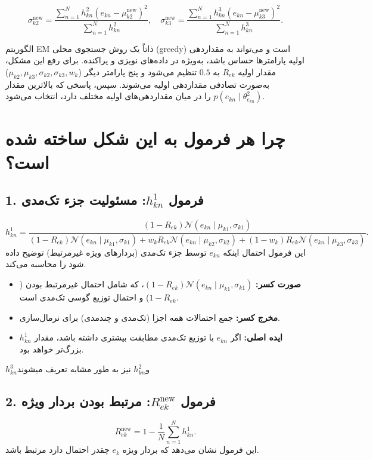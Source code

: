 \documentclass[a4paper,12pt,openany]{report}
\begin{document}
\begin{itemize}
	\[
	\sigma_{k2}^{\text{new}} = \frac{\sum_{n=1}^N h_{kn}^2 (e_{kn} - \mu_{k2}^{\text{new}})^2}{\sum_{n=1}^N h_{kn}^2}, \quad
	\sigma_{k3}^{\text{new}} = \frac{\sum_{n=1}^N h_{kn}^3 (e_{kn} - \mu_{k3}^{\text{new}})^2}{\sum_{n=1}^N h_{kn}^3}.
	\]
	
	الگوریتم EM ذاتاً یک روش جستجوی محلی (greedy) است و می‌تواند به مقداردهی اولیه پارامترها حساس باشد، به‌ویژه در داده‌های نویزی و پراکنده.  
	برای رفع این مشکل، مقدار اولیه \( R_{ek} \) به \( 0.5 \) تنظیم می‌شود و پنج پارامتر دیگر (\( \mu_{k2}, \mu_{k3}, \sigma_{k2}, \sigma_{k3}, w_k \)) به‌صورت تصادفی مقداردهی اولیه می‌شوند.  
	سپس، پاسخی که بالاترین مقدار \( p(e_{kn} \mid \theta_{e_{kn}}^2) \) را در میان مقداردهی‌های اولیه مختلف دارد، انتخاب می‌شود.
	
	\section{چرا هر فرمول به این شکل ساخته شده است؟}
	
	\subsection*{1. فرمول \( h_{kn}^1 \): مسئولیت جزء تک‌مدی}
	\[
	h_{kn}^1 = \frac{(1 - R_{ek}) \mathcal{N}(e_{kn} \mid \mu_{k1}, \sigma_{k1})}
	{(1 - R_{ek}) \mathcal{N}(e_{kn} \mid \mu_{k1}, \sigma_{k1}) + w_k R_{ek} \mathcal{N}(e_{kn} \mid \mu_{k2}, \sigma_{k2}) + (1 - w_k) R_{ek} \mathcal{N}(e_{kn} \mid \mu_{k3}, \sigma_{k3})}.
	\]
	این فرمول احتمال اینکه \( e_{kn} \) توسط جزء تک‌مدی (بردارهای ویژه غیرمرتبط) توضیح داده شود را محاسبه می‌کند.
	
	\begin{itemize}
		\item \textbf{صورت کسر:} 
		\((1 - R_{ek}) \mathcal{N}(e_{kn} \mid \mu_{k1}, \sigma_{k1})\)،
		که شامل احتمال غیرمرتبط بودن (\( 1 - R_{ek} \)) و احتمال توزیع گوسی تک‌مدی است.
		\item \textbf{مخرج کسر:} جمع احتمالات همه اجزا (تک‌مدی و چندمدی) برای نرمال‌سازی.
		\item \textbf{ایده اصلی:} 
		اگر \( e_{kn} \) با توزیع تک‌مدی مطابقت بیشتری داشته باشد، مقدار \( h_{kn}^1 \) بزرگ‌تر خواهد بود.
	\end{itemize}
	\( h_{kn}^3 \)و\( h_{kn}^2 \) نیز به طور مشابه تعریف میشوند
	
	\subsection*{2. فرمول \( R_{ek}^{\text{new}} \): مرتبط بودن بردار ویژه}
	\[
	R_{ek}^{\text{new}} = 1 - \frac{1}{N} \sum_{n=1}^N h_{kn}^1.
	\]
	این فرمول نشان می‌دهد که بردار ویژه \( e_k \) چقدر احتمال دارد مرتبط باشد.
	

\end{itemize}
\end{document}
